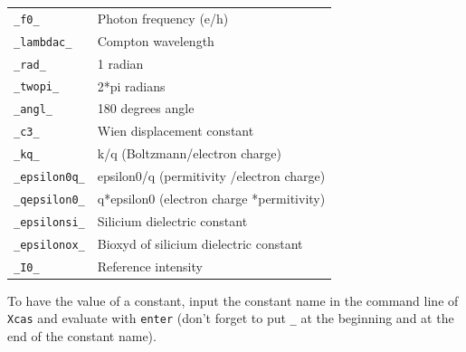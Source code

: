 \documentclass[a4paper,11pt]{book}
\begin{document}
\begin{center}
\begin{tabular}{|l|l|}
{\tt \_f0\_} &Photon frequency (e/h)\\
{\tt \_lambdac\_} &Compton wavelength\\
{\tt \_rad\_} &1 radian\\
{\tt \_twopi\_} &2*pi radians\\
{\tt \_angl\_} &180 degrees angle\\
{\tt \_c3\_} &Wien displacement constant\\
{\tt \_kq\_} & k/q (Boltzmann/electron charge)\\
{\tt \_epsilon0q\_} &epsilon0/q (permitivity /electron charge)\\
{\tt \_qepsilon0\_} &q*epsilon0 (electron charge *permitivity)\\
{\tt \_epsilonsi\_} &Silicium dielectric constant\\
{\tt \_epsilonox\_} &Bioxyd of silicium dielectric constant\\
{\tt \_I0\_} &Reference intensity\\
\hline
\end{tabular}
\end{center}
To have the value of a constant, input the constant name in the command line 
of {\tt Xcas} and evaluate with {\tt enter} (don't forget to put 
{\tt \_} at the beginning and at the end of the constant name).
\end{document}
